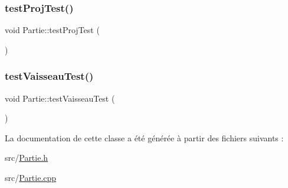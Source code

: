 \mbox{\label{class_partie_a6f27ab32773454f2d44a1cf3ef95ba47}} 
\subsubsection{\texorpdfstring{test\+Proj\+Test()}{testProjTest()}}
{\footnotesize\ttfamily void Partie\+::test\+Proj\+Test (\begin{DoxyParamCaption}{ }\end{DoxyParamCaption})}

\mbox{\label{class_partie_ad9ed353f340b606840fe4053ab7b6bf3}} 
\subsubsection{\texorpdfstring{test\+Vaisseau\+Test()}{testVaisseauTest()}}
{\footnotesize\ttfamily void Partie\+::test\+Vaisseau\+Test (\begin{DoxyParamCaption}{ }\end{DoxyParamCaption})}



La documentation de cette classe a été générée à partir des fichiers suivants \+:\begin{DoxyCompactItemize}
\item 
src/\hyperlink{_partie_8h}{Partie.\+h}\item 
src/\hyperlink{_partie_8cpp}{Partie.\+cpp}\end{DoxyCompactItemize}
